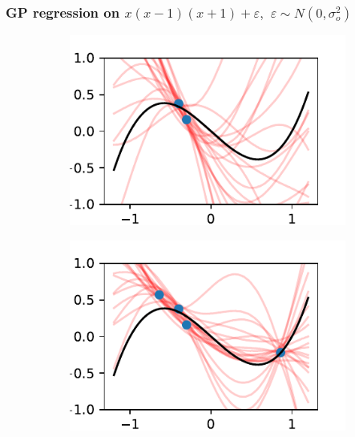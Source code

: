 \documentclass{beamer}
\begin{document}
\begin{frame}
    \frametitle{
        GP regression on $x(x-1)(x+1) + \varepsilon,$
        $\varepsilon \sim N(0, \sigma^2_o)$
    }
    \begin{figure}
        \centering
        \begin{subfigure}[t]{0.4\textwidth}
            \centering
            \includegraphics[width=\textwidth]{cub_GP_err_2_iters.pdf}
        \end{subfigure}%
        \begin{subfigure}[t]{0.4\textwidth}
            \centering
            \includegraphics[width=\textwidth]{cub_GP_err_4_iters.pdf}
        \end{subfigure}
        \begin{subfigure}[t]{0.4\textwidth}
            \centering

\end{subfigure}
\end{figure}
\end{frame}
\end{document}
